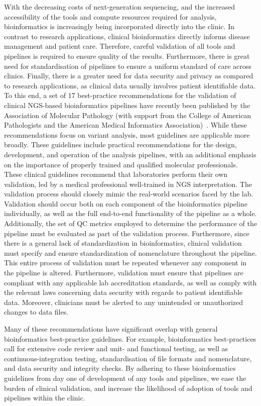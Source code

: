 \begin{justify}
With the decreasing costs of next-generation sequencing, and the increased accessibility of the tools and compute resources required for analysis, bioinformatics is increasingly being incorporated directly into the clinic. In contrast to research applications, clinical bioinformatics directly informs disease management and patient care.
Therefore, careful validation of all tools and pipelines is required to ensure quality of the results. Furthermore, there is great need for standardisation of pipelines to ensure a uniform standard of care across clinics. Finally, there is a greater need for data security and privacy as compared to research applications, as clinical data usually involves patient identifiable data.
To this end, a set of 17 best-practice recommendations for the validation of clinical NGS-based bioinformatics pipelines have recently been published by the Association of Molecular Pathology (with support from the College of American Pathologists and the American Medical Informatics Association)~\cite{roy2018standards}.
While these recommendations focus on variant analysis, most guidelines are applicable more broadly. These guidelines include practical recommendations for the design, development, and operation of the analysis pipelines, with an additional emphasis on the importance of properly trained and qualified molecular professionals.
These clinical guidelines recommend that laboratories perform their own validation, led by a medical professional well-trained in NGS interpretation. The validation process should closely mimic the real-world scenarios faced by the lab. Validation should occur both on each component of the bioinformatics pipeline individually, as well as the full end-to-end functionality of the pipeline as a whole.
Additionally, the set of QC metrics employed to determine the performance of the pipeline must be evaluated as part of the validation process.
Furthermore, since there is a general lack of standardization in bioinformatics, clinical validation must specify and ensure standardization of nomenclature throughout the pipeline. This entire process of validation must be repeated whenever any component in the pipeline is altered.
Furthermore, validation must ensure that pipelines are compliant with any applicable lab accreditation standards, as well as comply with the relevant laws concerning data security with regards to patient identifiable data.
Moreover, clinicians must be alerted to any unintended or unauthorized changes to data files.


Many of these recommendations have significant overlap with general bioinformatics best-practice guidelines.
For example, bioinformatics best-practices call for extensive code review and unit- and functional testing, as well as continuous-integration testing, standardisation of file formats and nomenclature, and data security and integrity checks.
By adhering to these bioinformatics guidelines from day one of development of any tools and pipelines, we ease the burden of clinical validation, and increase the likelihood of adoption of tools and pipelines within the clinic.


\end{justify}
